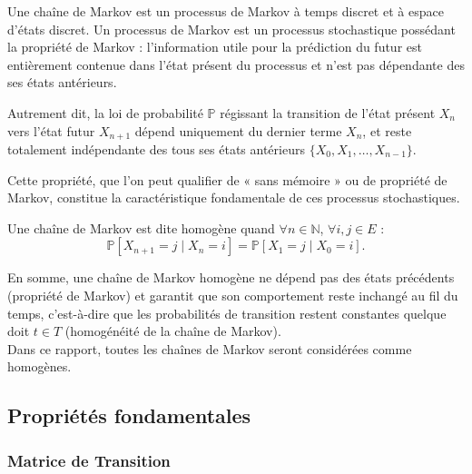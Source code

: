 \documentclass{article}
\begin{document}
Une chaîne de Markov est un processus de Markov à temps discret et à espace d'états discret. Un processus de Markov est un processus stochastique possédant la propriété de Markov : l'information utile pour la prédiction du futur est entièrement contenue dans l'état présent du processus et n'est pas dépendante des ses états antérieurs.

Autrement dit, la loi de probabilité $\mathbb{P}$ régissant la transition de l'état présent $X_n$ vers l'état futur $X_{n+1}$ dépend uniquement du dernier terme $X_n$, et reste totalement indépendante des tous ses états antérieurs $\{X_0, X_1, \dots, X_{n-1}\}$.

Cette propriété, que l'on peut qualifier de « sans mémoire » ou de propriété de Markov, constitue la caractéristique fondamentale de ces processus stochastiques. \\

\begin{tcolorbox}[colback=white,colframe=blue!80!black,title=Chaine de Markov Homogène]
Une chaîne de Markov est dite homogène quand $\forall n \in \mathbb{N}$, $\forall i,j \in E$ :
\[
  \mathbb{P}[X_{n+1} = j \mid X_n = i] = \mathbb{P}[X_1 = j \mid X_0 = i].
\]
\end{tcolorbox}

En somme, une chaîne de Markov homogène ne dépend pas des états précédents (propriété de Markov) et garantit que son comportement reste inchangé au fil du temps, c'est-à-dire que les probabilités de transition restent constantes quelque doit $t \in T$ (homogénéité de la chaîne de Markov). \\
Dans ce rapport, toutes les chaînes de Markov seront considérées comme homogènes. \\

\newpage
\subsection{Propriétés fondamentales}

\subsubsection{Matrice de Transition}
\end{document}
